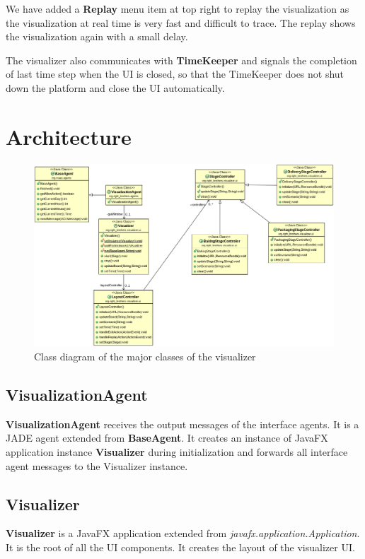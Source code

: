 \documentclass[12pt]{article}
\begin{document}
We have added a \textbf{Replay} menu item at top right to replay the visualization as the visualization at real time is very fast and difficult to trace. The replay shows the visualization again with a small delay.

The visualizer also communicates with \textbf{TimeKeeper} and signals the completion of last time step when the UI is closed, so that the TimeKeeper does not shut down the platform and close the UI automatically.

\section{Architecture}%
\label{sec:architecture}

\begin{figure}[htpb]
    \centering
    \includegraphics[width=1.0\linewidth]{class-diagram.png}
    \caption{Class diagram of the major classes of the visualizer}
\end{figure}


\subsection{VisualizationAgent}
\textbf{VisualizationAgent} receives the output messages of the interface agents. It is a JADE agent extended from \textbf{BaseAgent}. It creates an instance of JavaFX application instance \textbf{Visualizer} during initialization and forwards all interface agent messages to the Visualizer instance.

\subsection{Visualizer}
\textbf{Visualizer} is a JavaFX application extended from \textit{javafx.application.Application}. It is the root of all the UI components. It creates the layout of the visualizer UI.
\end{document}
